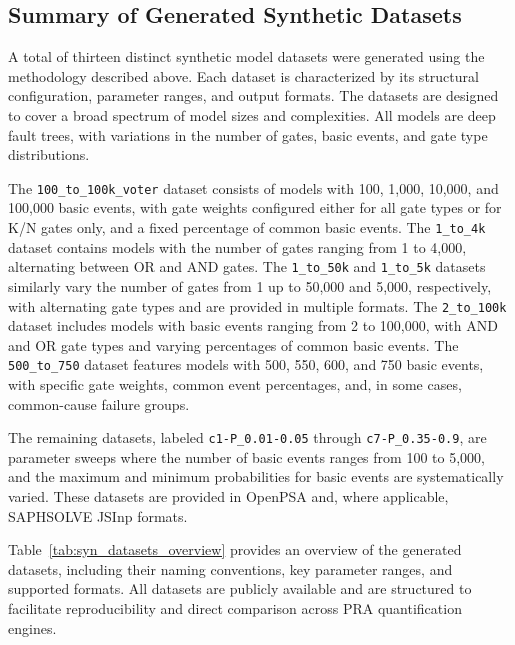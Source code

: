 \subsection{Summary of Generated Synthetic Datasets}
\label{sec:synthetic-datasets-summary}

A total of thirteen distinct synthetic model datasets \cite{aras_synthetic_2025} were generated using the methodology described above. Each dataset is characterized by its structural configuration, parameter ranges, and output formats. The datasets are designed to cover a broad spectrum of model sizes and complexities. All models are deep fault trees, with variations in the number of gates, basic events, and gate type distributions.

The \texttt{100\_to\_100k\_voter} dataset consists of models with 100, 1,000, 10,000, and 100,000 basic events, with gate weights configured either for all gate types or for K/N gates only, and a fixed percentage of common basic events. The \texttt{1\_to\_4k} dataset contains models with the number of gates ranging from 1 to 4,000, alternating between OR and AND gates. The \texttt{1\_to\_50k} and \texttt{1\_to\_5k} datasets similarly vary the number of gates from 1 up to 50,000 and 5,000, respectively, with alternating gate types and are provided in multiple formats. The \texttt{2\_to\_100k} dataset includes models with basic events ranging from 2 to 100,000, with AND and OR gate types and varying percentages of common basic events. The \texttt{500\_to\_750} dataset features models with 500, 550, 600, and 750 basic events, with specific gate weights, common event percentages, and, in some cases, common-cause failure groups.

The remaining datasets, labeled \texttt{c1-P\_0.01-0.05} through \texttt{c7-P\_0.35-0.9}, are parameter sweeps where the number of basic events ranges from 100 to 5,000, and the maximum and minimum probabilities for basic events are systematically varied. These datasets are provided in OpenPSA and, where applicable, SAPHSOLVE JSInp formats.

Table~\ref{tab:syn_datasets_overview} provides an overview of the generated datasets, including their naming conventions, key parameter ranges, and supported formats. All datasets are publicly available and are structured to facilitate reproducibility and direct comparison across PRA quantification engines.





